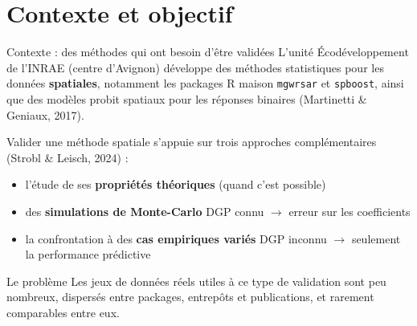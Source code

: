 \documentclass[aspectratio=169,11pt]{beamer}
\begin{document}
\section{Contexte et objectif}
\begin{frame}{Contexte : des méthodes qui ont besoin d'être validées}
\small
L'unité Écodéveloppement de l'INRAE (centre d'Avignon) développe des méthodes
statistiques pour les données \textbf{spatiales}, notamment les packages R
maison \texttt{mgwrsar} et \texttt{spboost}, ainsi que des modèles probit
spatiaux pour les réponses binaires (Martinetti \& Geniaux, 2017).
\vspace{0.2cm}

Valider une méthode spatiale s'appuie sur trois approches complémentaires
(Strobl \& Leisch, 2024) :
\begin{itemize}
    \item l'étude de ses \textbf{propriétés théoriques} \hfill{\footnotesize\textcolor{mygray}{(quand c'est possible)}}
    \item des \textbf{simulations de Monte-Carlo} \hfill{\footnotesize\textcolor{mygray}{DGP connu $\to$ erreur sur les coefficients}}
    \item la confrontation à des \textbf{cas empiriques variés} \hfill{\footnotesize\textcolor{mygray}{DGP inconnu $\to$ seulement la performance prédictive}}
\end{itemize}
\vspace{0.2cm}
\begin{block}{Le problème}
Les jeux de données réels utiles à ce type de validation sont peu nombreux,
dispersés entre packages, entrepôts et publications, et rarement comparables
entre eux.
\end{block}
\end{frame}
\end{document}
